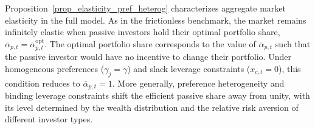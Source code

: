 Proposition~\ref{prop_elasticity_pref_heterog} characterizes aggregate market elasticity in the full model. As in the frictionless benchmark, the market remains infinitely elastic when passive investors hold their optimal portfolio share, $\overline{\alpha}_{p,t}=\overline{\alpha}_{p,t}^{\mathrm{opt}}$. 
The optimal portfolio share corresponds to the value of $\overline{\alpha}_{p,t}$ such that the passive investor would have no incentive to change their portfolio. 
Under homogeneous preferences ($\gamma_j=\gamma$) and slack leverage constraints ($x_{c,t}=0$), this condition reduces to $\overline{\alpha}_{p,t}=1$. More generally, preference heterogeneity and binding leverage constraints shift the efficient passive share away from unity, with its level determined by the wealth distribution and the relative risk aversion of different investor types.




